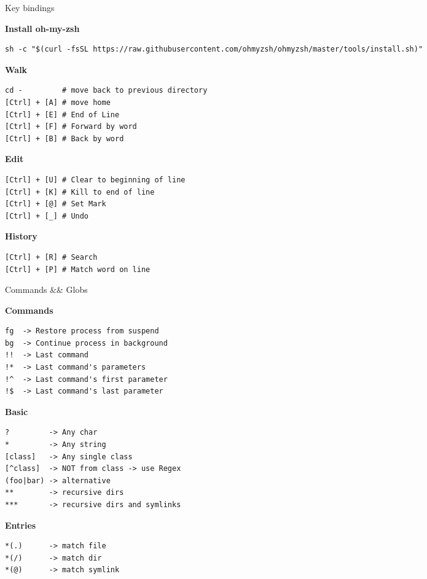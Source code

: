 \documentclass[10pt]{article}
\begin{document}
\setlength{\columnsep}{20pt}
\begin{multicols}{2}

{\titlefont\color{blueheader}\faNetworkWired\quad Key bindings }\vspace{5pt}

\textbf{\color{blueheader}Install oh-my-zsh}
\begin{lstlisting}
sh -c "$(curl -fsSL https://raw.githubusercontent.com/ohmyzsh/ohmyzsh/master/tools/install.sh)"
\end{lstlisting}

  \textbf{\color{blueheader}Walk}
\begin{lstlisting}
cd -         # move back to previous directory
[Ctrl] + [A] # move home
[Ctrl] + [E] # End of Line 
[Ctrl] + [F] # Forward by word 
[Ctrl] + [B] # Back by word  
\end{lstlisting}

\textbf{\color{blueheader} Edit}
\begin{lstlisting}
[Ctrl] + [U] # Clear to beginning of line 
[Ctrl] + [K] # Kill to end of line
[Ctrl] + [@] # Set Mark
[Ctrl] + [_] # Undo
\end{lstlisting}

\textbf{\color{blueheader}History}
\begin{lstlisting}
[Ctrl] + [R] # Search 
[Ctrl] + [P] # Match word on line  
\end{lstlisting}

\vfill\null\columnbreak

  {\titlefont\color{blueheader}\faTools\quad Commands && Globs}\vspace{5pt}

\textbf{\color{blueheader}Commands}
\begin{lstlisting}
fg  -> Restore process from suspend
bg  -> Continue process in background  
!!  -> Last command 
!*  -> Last command's parameters 
!^  -> Last command's first parameter 
!$  -> Last command's last parameter 
\end{lstlisting}

\textbf{\color{blueheader}Basic}
\begin{lstlisting}
?         -> Any char
*         -> Any string 
[class]   -> Any single class
[^class]  -> NOT from class -> use Regex 
(foo|bar) -> alternative
**        -> recursive dirs 
***       -> recursive dirs and symlinks 
\end{lstlisting}

\textbf{\color{blueheader}Entries}
\begin{lstlisting}
*(.)      -> match file 
*(/)      -> match dir
*(@)      -> match symlink
\end{lstlisting}

\end{multicols}
\end{document}
